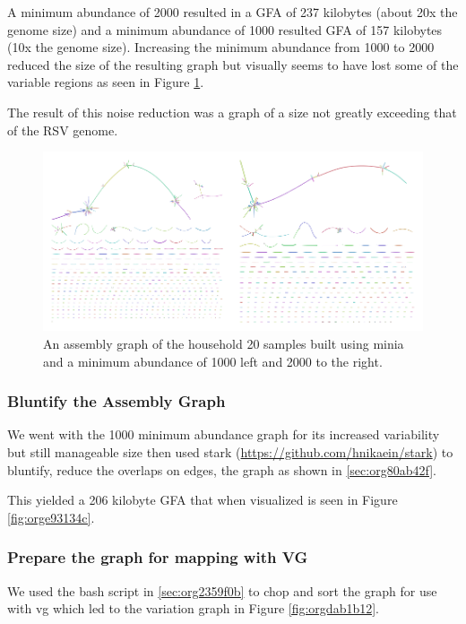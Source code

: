\documentclass[10pt, a4paper]{article}
\begin{document}
A minimum abundance of 2000 resulted in a GFA of 237 kilobytes
(about 20x the genome size) and a minimum abundance of 1000 resulted GFA of 
157 kilobytes (10x the genome size). 
Increasing the minimum abundance from 1000 to 2000 reduced the size of the 
resulting graph but visually seems to have lost some of the variable regions as 
seen in Figure \ref{fig:orgcd8d79f}.

The result of this noise reduction was a graph of a size not greatly exceeding
that of the RSV genome. 

\begin{figure}[h]
\centering
\includegraphics[width=.9\linewidth]{../Figures/RSV/Assembly_Combined.png}
\caption[RSV Assembly Graph]{\label{fig:orgcd8d79f}
An assembly graph of the household 20 samples built using minia and a minimum abundance of 1000 left and 2000 to the right.}
\end{figure}

\subsubsection{Bluntify the Assembly Graph}
\label{sec:org8c68be0}
We went with the 1000 minimum abundance graph for its increased variability but 
still manageable size then used stark (\url{https://github.com/hnikaein/stark}) to 
bluntify, reduce the overlaps on edges, \cite{gargGraphbasedApproachDiploid2018} the graph as shown in
\ref{sec:org80ab42f}.

This yielded a 206 kilobyte GFA that when visualized is seen in Figure
\ref{fig:orge93134c}.

\subsubsection{Prepare the graph for mapping with VG}
\label{sec:org7e387bf}
We used the bash script in \ref{sec:org2359f0b} to chop and sort the graph for 
use with vg \cite{garrisonVariationGraphToolkit2018} which led to the variation graph in Figure \ref{fig:orgdab1b12}.
\end{document}
